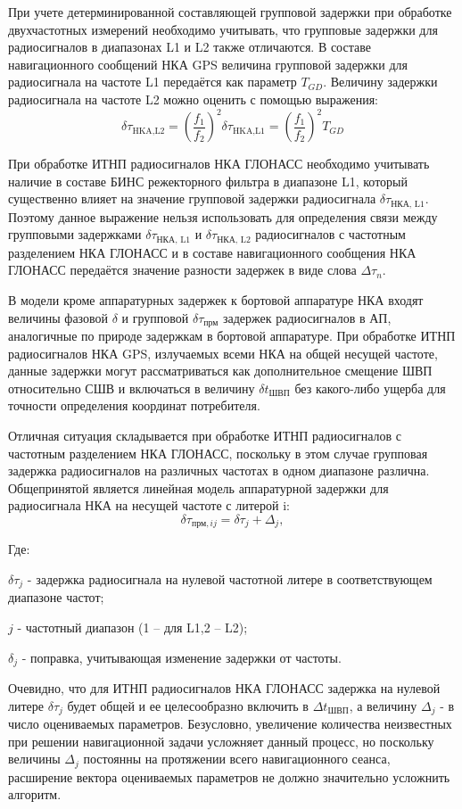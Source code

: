 \documentclass[14pt,a4paper,oneside]{extarticle}
\begin{document}
При учете детерминированной составляющей групповой задержки при обработке двухчастотных измерений необходимо учитывать, что групповые задержки для радиосигналов в диапазонах L1 и L2 также отличаются. В составе навигационного сообщений НКА GPS величина групповой задержки для радиосигнала на частоте L1 передаётся как параметр $T_{GD}$. Величину задержки радиосигнала на частоте L2 можно оценить с помощью выражения: \[\delta\tau_{\text{HKA,L2}}=\left(\frac{f_{1}}{f_{2}}\right)^{2}\delta\tau_{\text{HKA,L1}}=\left(\frac{f_{1}}{f_{2}}\right)^{2}T_{GD}\]

При обработке ИТНП радиосигналов НКА ГЛОНАСС необходимо учитывать наличие в составе БИНС режекторного фильтра в диапазоне L1, который существенно влияет на значение групповой задержки радиосигнала $\delta\tau_\text{НКА, L1}$. Поэтому данное выражение нельзя использовать для определения связи между групповыми задержками $\delta\tau_\text{НКА, L1}$ и $\delta\tau_\text{НКА, L2}$ радиосигналов с частотным разделением НКА ГЛОНАСС и в составе навигационного сообщения НКА ГЛОНАСС передаётся значение разности задержек в виде слова $\Delta\tau_n$.

В модели кроме аппаратурных задержек к бортовой аппаратуре НКА входят величины фазовой $\delta$ и групповой $\delta\tau_\text{прм}$ задержек радиосигналов в АП, аналогичные по природе задержкам в бортовой аппаратуре. При обработке ИТНП радиосигналов НКА GPS, излучаемых всеми НКА на общей несущей частоте, данные задержки могут рассматриваться как дополнительное смещение ШВП относительно СШВ и включаться в величину $\delta t_\text{ШВП}$ без какого-либо ущерба для точности определения координат потребителя.

Отличная ситуация складывается при обработке ИТНП радиосигналов с частотным разделением НКА ГЛОНАСС, поскольку в этом случае групповая задержка радиосигналов на различных частотах в одном диапазоне различна. Общепринятой является линейная модель аппаратурной задержки для радиосигнала НКА на несущей частоте с литерой i: \[\delta\tau_{\text{прм},ij}=\delta\tau_{j}+\Delta_{j},\] 

Где:

$\delta\tau_j$ - задержка радиосигнала на нулевой частотной литере в соответствующем диапазоне частот;

$j$ - частотный диапазон (1 – для L1,2 – L2);

$\delta_j$ - поправка, учитывающая изменение задержки от частоты.

Очевидно, что для ИТНП радиосигналов НКА ГЛОНАСС задержка на нулевой литере $\delta\tau_j$ будет общей и ее целесообразно включить в $\Delta t_\text{ШВП}$, а величину $\Delta_j$ - в число оцениваемых параметров. Безусловно, увеличение количества неизвестных при решении навигационной задачи усложняет данный процесс, но поскольку величины $\Delta_j$ постоянны на протяжении всего навигационного сеанса, расширение вектора оцениваемых параметров не должно значительно усложнить алгоритм. 
\end{document}
